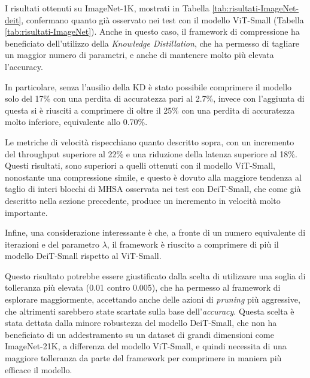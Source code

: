 I risultati ottenuti su ImageNet-1K, mostrati in Tabella \ref{tab:risultati-ImageNet-deit}, confermano quanto già osservato nei test con il modello ViT-Small (Tabella \ref{tab:risultati-ImageNet}). Anche in questo caso, il framework di compressione ha beneficiato dell'utilizzo della \textit{Knowledge Distillation}, che ha permesso di tagliare un maggior numero di parametri, e anche di mantenere molto più elevata l'accuracy. \par

In particolare, senza l'ausilio della KD è stato possibile comprimere il modello solo del 17\% con una perdita di accuratezza pari al 2.7\%, invece con l'aggiunta di questa si è riusciti a comprimere di oltre il 25\% con una perdita di accuratezza molto inferiore, equivalente allo 0.70\%. \par

Le metriche di velocità rispecchiano quanto descritto sopra, con un incremento del throughput superiore al 22\% e una riduzione della latenza superiore al 18\%. Questi risultati, sono superiori a quelli ottenuti con il modello ViT-Small, nonostante una compressione simile, e questo è dovuto alla maggiore tendenza al taglio di interi blocchi di MHSA osservata nei test con DeiT-Small, che come già descritto nella sezione precedente, produce un incremento in velocità molto importante. \par

Infine, una considerazione interessante è che, a fronte di un numero equivalente di iterazioni e del parametro $\lambda$, il framework è riuscito a comprimere di più il modello DeiT-Small rispetto al ViT-Small. \par

Questo risultato potrebbe essere giustificato dalla scelta di utilizzare una soglia di tolleranza più elevata (0.01 contro 0.005), che ha permesso al framework di esplorare maggiormente, accettando anche delle azioni di \textit{pruning} più aggressive, che altrimenti sarebbero state scartate sulla base dell'\textit{accuracy}. Questa scelta è stata dettata dalla minore robustezza del modello DeiT-Small, che non ha beneficiato di un addestramento su un dataset di grandi dimensioni come ImageNet-21K, a differenza del modello ViT-Small, e quindi necessita di una maggiore tolleranza da parte del framework per comprimere in maniera più efficace il modello.

